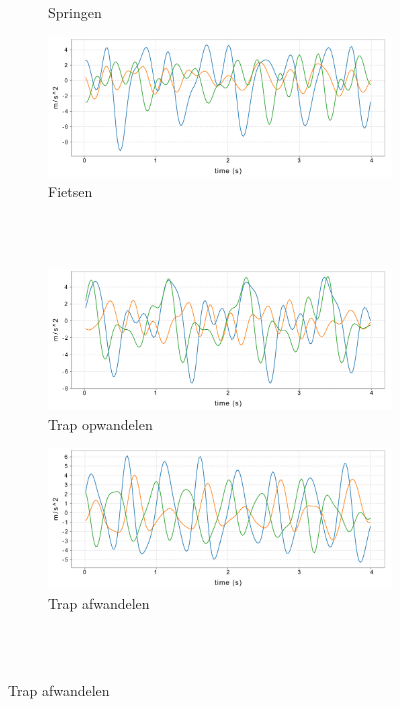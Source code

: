 \documentclass{article}
\begin{document}
\begin{figure}
\begin{subfigure}[b]{.49\linewidth}
    \caption{Springen}\label{fig:1c}
  \end{subfigure}
  \begin{subfigure}[b]{.49\linewidth}
    \centering
    \includegraphics[width=.99\textwidth]{figures/fietsen}
    \caption{Fietsen}\label{fig:1d}
  \end{subfigure} \\~\\
  \begin{subfigure}[b]{.49\linewidth}
    \centering
    \includegraphics[width=.99\textwidth]{figures/trapop}
    \caption{Trap opwandelen}\label{fig:1e}
  \end{subfigure} 
  \begin{subfigure}[b]{.49\linewidth}
    \centering 
    \includegraphics[width=.99\textwidth]{figures/trapaf}
    \caption{Trap afwandelen}\label{fig:1f}
  \end{subfigure} \\~\\

\end{figure}
\end{document}
